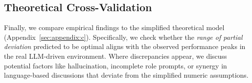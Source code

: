 \subsection{Theoretical Cross-Validation}
\label{subsec:cross-validation}
Finally, we compare empirical findings to the simplified theoretical model (Appendix~\ref{sec:appendix:c}). Specifically, we check whether the \emph{range of partial deviation} predicted to be optimal aligns with the observed performance peaks in the real LLM-driven environment. Where discrepancies appear, we discuss potential factors like hallucination, incomplete role prompts, or synergy in language-based discussions that deviate from the simplified numeric assumptions.
